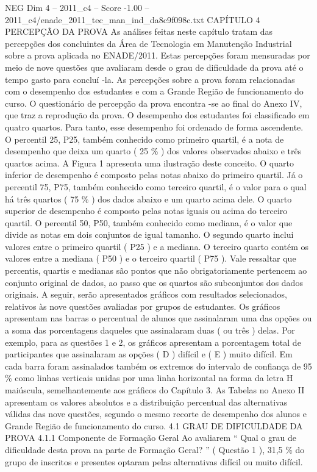 \begin{textsample}{NEG Dim 4 – 2011\_c4 – Score -1.00 – 2011\_c4/enade\_2011\_tec\_man\_ind\_da8c9f098c.txt}  \label{ex:f4_neg_123}
CAPÍTULO 4 PERCEPÇÃO DA PROVA As análises feitas neste capítulo tratam das percepções dos concluintes da Área de Tecnologia em Manutenção Industrial sobre a prova aplicada no ENADE/2011.
Estas percepções foram mensuradas por meio de nove questões que avaliaram desde o grau de dificuldade da prova até o tempo gasto para concluí -la.
As percepções sobre a prova foram relacionadas com o desempenho dos estudantes e com a Grande Região de funcionamento do curso.
O questionário de percepção da prova encontra -se ao final do Anexo IV, que traz a reprodução da prova.
O desempenho dos estudantes foi classificado em quatro quartos.
Para tanto, esse desempenho foi ordenado de forma ascendente.
O percentil 25, P25, também conhecido como primeiro quartil, é a nota de desempenho que deixa um quarto ( 25 \% ) dos valores observados abaixo e três quartos acima.
A Figura 1 apresenta uma ilustração deste conceito.
O quarto inferior de desempenho é composto pelas notas abaixo do primeiro quartil.
Já o percentil 75, P75, também conhecido como terceiro quartil, é o valor para o qual há três quartos ( 75 \% ) dos dados abaixo e um quarto acima dele.
O quarto superior de desempenho é composto pelas notas iguais ou acima do terceiro quartil.
O percentil 50, P50, também conhecido como mediana, é o valor que divide as notas em dois conjuntos de igual tamanho.
O segundo quarto inclui valores entre o primeiro quartil ( P25 ) e a mediana.
O terceiro quarto contém os valores entre a mediana ( P50 ) e o terceiro quartil ( P75 ).
Vale ressaltar que percentis, quartis e medianas são pontos que não obrigatoriamente pertencem ao conjunto original de dados, ao passo que os quartos são subconjuntos dos dados originais.
A seguir, serão apresentados gráficos com resultados selecionados, relativos às nove questões avaliadas por grupos de estudantes.
Os gráficos apresentam nas barras o percentual de alunos que assinalaram uma das opções ou a soma das porcentagens daqueles que assinalaram duas ( ou três ) delas.
Por exemplo, para as questões 1 e 2, os gráficos apresentam a porcentagem total de participantes que assinalaram as opções ( D ) difícil e ( E ) muito difícil.
Em cada barra foram assinalados também os extremos do intervalo de confiança de 95 \% como linhas verticais unidas por uma linha horizontal na forma da letra H maiúscula, semelhantemente aos gráficos do Capítulo 3.
As Tabelas no Anexo II apresentam os valores absolutos e a distribuição percentual das alternativas válidas das nove questões, segundo o mesmo recorte de desempenho dos alunos e Grande Região de funcionamento do curso. 4.1 GRAU DE DIFICULDADE DA PROVA 4.1.1 Componente de Formação Geral Ao avaliarem “ Qual o grau de dificuldade desta prova na parte de Formação Geral? ” ( Questão 1 ), 31,5 \% do grupo de inscritos e presentes optaram pelas alternativas difícil ou muito difícil.

\end{textsample}
